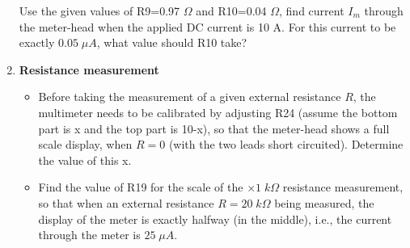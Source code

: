 \begin{enumerate}
  Use the given values of R9=0.97 $\Omega$ and R10=0.04 $\Omega$, find current
  $I_m$ through the meter-head when the applied DC current is 10 A. For this
  current to be exactly $0.05\;\mu A$, what value should R10 take?
  
  \begin{comment}
  {\bf Solution:}

  The circuit for each scale of the DC current measurement is a current divider
  with an internal resistance for the meter-head:

  \begin{itemize}
  \item 2.5 mA
    \[
    I_m=2.5\;\frac{R12}{R12+5000}=0.05,\;\;\;\;\;\;\;R12=102
    \]
  \item 25 mA
    \[
    I_m=25\;\frac{R11}{R11+5000}=0.05,\;\;\;\;\;\;\;R11=10
    \]
  \item 250 mA
    \[
    I_m=250\;\frac{R9+R10}{R9+R10+5000}=0.05,\;\;\;\;\;\;\;\;\;R9+R10=1
    \]
  \end{itemize}
  \[
  I_m=10000\;\frac{R10}{5000+0.97+R10}=0.05\;mA,\;\;\;\;\;
  R10=0.025\;\Omega
  \]
  \end{comment}

\item {\bf Resistance measurement}

  \begin{itemize}
  \item Before taking the measurement of a given external resistance $R$, 
    the multimeter needs to be calibrated by adjusting R24 (assume the bottom 
    part is x and the top part is 10-x), so that the meter-head shows a full 
    scale display, when $R=0$ (with the two leads short circuited). Determine 
    the value of this x. 

  \item Find the value of R19 for the scale of the $\times 1\;k\Omega$
    resistance measurement, so that when an external resistance $R=20\;k\Omega$
    being measured, the display of the meter is exactly halfway (in the middle),
    i.e., the current through the meter is $25\;\mu A$.

  \end{itemize}

  \begin{comment}
  {\bf Solution:}
  
  \begin{itemize}
  \item Calibration:


\end{comment}
\end{enumerate}

